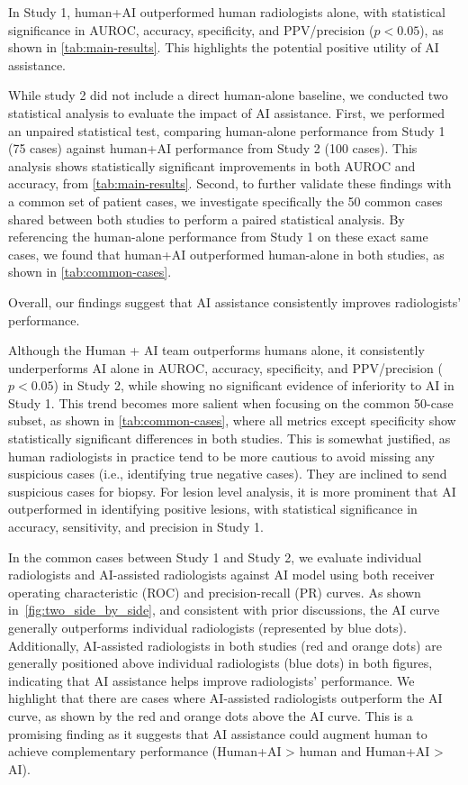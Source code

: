 

 
In Study 1, human+AI outperformed human radiologists alone, with statistical significance in AUROC, accuracy, specificity, and PPV/precision ($p<0.05$), as shown in \cref{tab:main-results}. This highlights the potential positive utility of AI assistance.


While study 2 did not include a direct human-alone baseline, we conducted two statistical analysis to evaluate the impact of AI assistance. First, we performed an unpaired statistical test, comparing human-alone performance from Study 1 (75 cases) against human+AI performance from Study 2 (100 cases). This analysis shows statistically significant improvements in both AUROC and accuracy, from \cref{tab:main-results}. Second, to further validate these findings with a common set of patient cases, we investigate specifically the 50 common cases shared between both studies to perform a paired statistical analysis. By referencing the human-alone performance from Study 1 on these exact same cases, we found that human+AI  outperformed human-alone in both studies, as shown in \cref{tab:common-cases}.


Overall, our findings suggest that AI assistance consistently improves radiologists' performance. 


Although the Human + AI team outperforms humans alone, it consistently underperforms AI alone in AUROC, accuracy, specificity, and PPV/precision ($p<0.05$) in Study 2, while showing no significant evidence of inferiority to AI in Study 1.
This trend becomes more salient when focusing on the common 50-case subset, as shown in \cref{tab:common-cases}, where all metrics except specificity show statistically significant differences in both studies.
This is somewhat justified, as human radiologists in practice tend to be more cautious to avoid missing any suspicious cases (i.e., identifying true negative cases). They are inclined to send suspicious cases for biopsy.  
For lesion level analysis, it is more prominent that AI outperformed \hai in identifying positive lesions, with statistical significance in accuracy, sensitivity, and precision in Study 1. 


In the common cases between Study 1 and Study 2, we evaluate individual radiologists and AI-assisted radiologists against AI model using both receiver operating characteristic (ROC) and precision-recall (PR) curves. 
As shown in~\cref{fig:two_side_by_side}, and consistent with prior discussions, the AI curve generally outperforms individual radiologists (represented by blue dots).
Additionally, AI-assisted radiologists in both studies (red and orange dots) are generally positioned above individual radiologists (blue dots) in both figures, indicating that AI assistance helps improve radiologists’ performance.
We highlight that there are cases where AI-assisted radiologists outperform the AI curve, as shown by the red and orange dots above the AI curve. This is a promising finding as it suggests that AI assistance could augment human to achieve complementary performance (Human+AI > human and Human+AI > AI).



